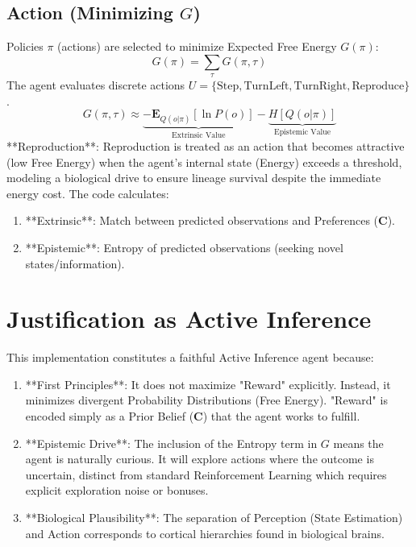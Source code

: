 \documentclass{article}
\begin{document}
\subsection{Action (Minimizing $G$)}
Policies $\pi$ (actions) are selected to minimize Expected Free Energy $G(\pi)$:
\begin{equation}
G(\pi) = \sum_{\tau} G(\pi, \tau)
\end{equation}
The agent evaluates discrete actions $U = \{ \text{Step}, \text{TurnLeft}, \text{TurnRight}, \text{Reproduce} \}$.
\begin{equation}
G(\pi, \tau) \approx \underbrace{- \mathbf{E}_{Q(o|\pi)}[\ln P(o)]}_{\text{Extrinsic Value}} - \underbrace{H[Q(o|\pi)]}_{\text{Epistemic Value}}
\end{equation}
**Reproduction**:
Reproduction is treated as an action that becomes attractive (low Free Energy) when the agent's internal state (Energy) exceeds a threshold, modeling a biological drive to ensure lineage survival despite the immediate energy cost.
The code calculates:
\begin{enumerate}
    \item **Extrinsic**: Match between predicted observations and Preferences ($\mathbf{C}$).
    \item **Epistemic**: Entropy of predicted observations (seeking novel states/information).
\end{enumerate}
\section{Justification as Active Inference}
This implementation constitutes a faithful Active Inference agent because:
\begin{enumerate}
    \item **First Principles**: It does not maximize "Reward" explicitly. Instead, it minimizes divergent Probability Distributions (Free Energy). "Reward" is encoded simply as a Prior Belief ($\mathbf{C}$) that the agent works to fulfill.
    \item **Epistemic Drive**: The inclusion of the Entropy term in $G$ means the agent is naturally curious. It will explore actions where the outcome is uncertain, distinct from standard Reinforcement Learning which requires explicit exploration noise or bonuses.
    \item **Biological Plausibility**: The separation of Perception (State Estimation) and Action corresponds to cortical hierarchies found in biological brains.
\end{enumerate}
\end{document}

